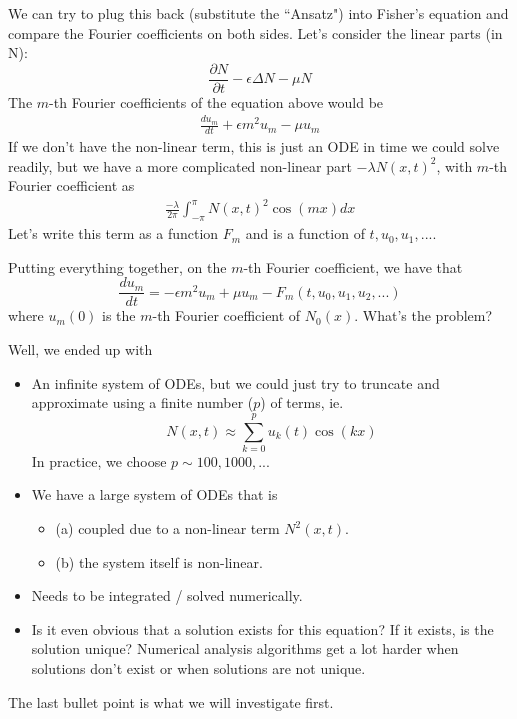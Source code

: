 \documentclass{article}
\begin{document}
We can try to plug this back (substitute the ``Ansatz") into Fisher's equation and compare the Fourier coefficients on both sides. Let's consider the linear parts (in N):
\[\frac{\partial N}{\partial t} - \epsilon \Delta N - \mu N\]
The $m$-th Fourier coefficients of the equation above would be
\begin{align*}
    \frac{d u_m}{dt} + \epsilon m^2 u_m - \mu u_m  
\end{align*}
If we don't have the non-linear term, this is just an ODE in time we could solve readily, but we have a more complicated non-linear part $- \lambda N(x, t)^2$, with $m$-th Fourier coefficient as
\begin{align*}
    \frac{-\lambda}{2\pi} \int_{-\pi}^{\pi} N(x, t)^2 \cos(mx) dx
\end{align*}
Let's write this term as a function $F_m$ and is a function of $t, u_0, u_1, ...$. 

\begin{question}
Putting everything together, on the $m$-th Fourier coefficient, we have that
\[\frac{d u_m}{dt} = - \epsilon m^2 u_m + \mu u_m - F_m(t, u_0, u_1, u_2, ...)\]
where $u_m(0)$ is the $m$-th Fourier coefficient of $N_0(x)$. What's the problem?
\end{question}

Well, we ended up with
\begin{itemize}
    \item An infinite system of ODEs, but we could just try to truncate and approximate using a finite number ($p$) of terms, ie.
    \[N(x, t) \approx \sum_{k = 0}^p u_k(t) \cos(kx)\]
    In practice, we choose $p \sim 100, 1000, ...$
    \item We have a large system of ODEs that is 
    \begin{itemize}
        \item (a) coupled due to a non-linear term $N^2(x,t)$.
        \item (b) the system itself is non-linear.
    \end{itemize}
    \item Needs to be integrated / solved numerically.
    \item Is it even obvious that a solution exists for this equation? If it exists, is the solution unique? Numerical analysis algorithms get a lot harder when solutions don't exist or when solutions are not unique.
\end{itemize}

The last bullet point is what we will investigate first.
\end{document}
